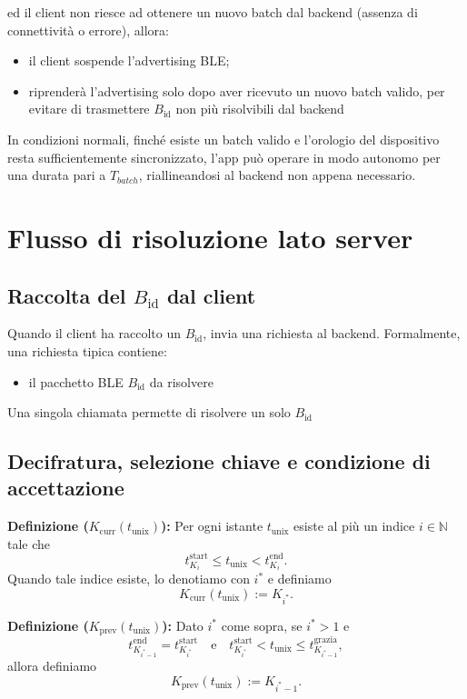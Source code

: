 \documentclass[a4paper,11pt]{article}
\begin{document}
ed il client non riesce ad ottenere un nuovo batch dal backend (assenza di connettività o errore), allora:
\begin{itemize}
  \item il client sospende l'advertising BLE;
  \item riprenderà l'advertising solo dopo aver ricevuto un nuovo batch valido, per evitare di trasmettere $B_{\text{id}}$ non più risolvibili dal backend
\end{itemize}

In condizioni normali, finché esiste un batch valido e l'orologio del dispositivo resta sufficientemente sincronizzato, l'app può operare in modo autonomo per una durata pari a $T_{batch}$, riallineandosi al backend non appena necessario.

\section{Flusso di risoluzione lato server}
\subsection{Raccolta del \(B_{\text{id}}\) dal client}
Quando il client ha raccolto un $B_{\text{id}}$, invia una richiesta al backend.
Formalmente, una richiesta tipica contiene:
\begin{itemize}
  \item il pacchetto BLE \(B_{\text{id}}\) da risolvere
\end{itemize}

Una singola chiamata permette di risolvere un solo $B_{\text{id}}$

\subsection{Decifratura, selezione chiave e condizione di accettazione}
\textbf{Definizione (\(K_{\text{curr}}(t_{\text{unix}})\)):} Per ogni istante \(t_{\text{unix}}\) esiste al più un indice \(i \in \mathbb{N}\) tale che
\[
  t_{K_i}^{\text{start}} \le t_{\text{unix}} < t_{K_i}^{\text{end}}.
\]
Quando tale indice esiste, lo denotiamo con \(i^\ast\) e definiamo
\[
  K_{\text{curr}}(t_{\text{unix}}) := K_{i^\ast}.
\]

\textbf{Definizione (\(K_{\text{prev}}(t_{\text{unix}})\)):} Dato \(i^\ast\) come sopra, se \(i^\ast > 1\) e
\[
  t_{K_{i^\ast-1}}^{\text{end}} = t_{K_{i^\ast}}^{\text{start}}
  \quad\text{e}\quad
  t_{K_{i^\ast}}^{\text{start}} < t_{\text{unix}} \le t_{K_{i^\ast-1}}^{\text{grazia}},
\]
allora definiamo
\[
  K_{\text{prev}}(t_{\text{unix}}) := K_{i^\ast-1}.
\]
\end{document}
